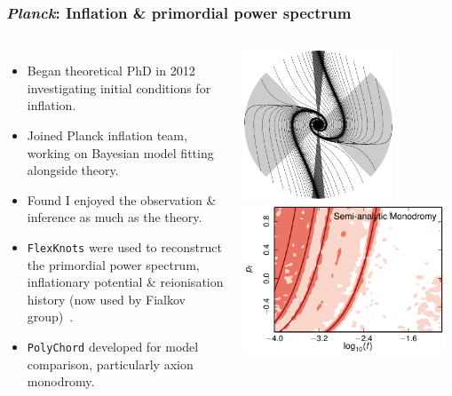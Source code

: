 \documentclass[aspectratio=169, handout]{beamer}
\begin{document}
\begin{frame}
    \frametitle{\textit{Planck}: Inflation \& primordial power spectrum}
    \begin{columns}
        \begin{itemize}
            \item Began theoretical PhD in 2012 investigating initial conditions for inflation.
            \item Joined Planck inflation team, working on Bayesian model fitting alongside theory.
            \item Found I enjoyed the observation \& inference as much as the theory.
            \item \texttt{FlexKnots} were used to reconstruct the primordial power spectrum, inflationary potential \& reionisation history (now used by Fialkov group)~.
            \item \texttt{PolyChord} developed for model comparison, particularly axion monodromy.
        \end{itemize}

        \includegraphics[height=0.4\textwidth]{figures/kinetic_dominance.pdf}%
        \includegraphics[height=0.4\textwidth]{figures/axion_monodromy.pdf}



\end{columns}
\end{frame}
\end{document}
